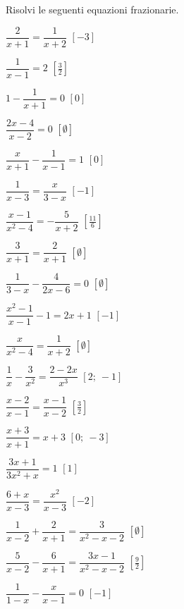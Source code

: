\begin{esercizio}[\Ast]
\label{ese:20.15}
Risolvi le seguenti equazioni frazionarie.
\begin{multicols}{2}
\begin{enumeratea}
 \item $\dfrac{2}{x+1}=\dfrac{1}{x+2}$ \hfill $\left[-3\right]$
 \item $\dfrac{1}{x-1}=2$ \hfill $\left[\frac{3}{2}\right]$
 \item $1-\dfrac{1}{x+1}=0$ \hfill $\left[0\right]$
 \item $\dfrac{2x-4}{x-2}=0$ \hfill $\left[\emptyset\right]$
 \item $\dfrac{x}{x+1}-\dfrac{1}{x-1}=1$ \hfill $\left[0\right]$
 \item $\dfrac{1}{x-3}=\dfrac{x}{3-x}$ \hfill $\left[-1\right]$
 \item $\dfrac{x-1}{x^{2}-4}=-{\dfrac{5}{x+2}}$ 
  \hfill $\left[\frac{11}{6}\right]$
 \item $\dfrac{3}{x+1}=\dfrac{2}{x+1}$ \hfill $\left[\emptyset\right]$
 \item $\dfrac{1}{3-x}-\dfrac{4}{2x-6}=0$ \hfill $\left[\emptyset\right]$
 \item $\dfrac{x^{2}-1}{x-1}-1=2x+1$ \hfill $\left[-1\right]$
 \item $\dfrac{x}{x^{2}-4}=\dfrac{1}{x+2}$ \hfill $\left[\emptyset\right]$
 \item $\dfrac{1}{x}-\dfrac{3}{x^{2}}=\dfrac{2-2x}{x^{3}}$ 
  \hfill $\left[2;~-1\right]$
 \item $\dfrac{x-2}{x-1}=\dfrac{x-1}{x-2}$ \hfill $\left[\frac{3}{2}\right]$
 \item $\dfrac{x+3}{x+1}=x+3$ \hfill $\left[0;~-3\right]$
 \item $\dfrac{3x+1}{3x^{2}+x}=1$ \hfill $\left[1\right]$
 \item $\dfrac{6+x}{x-3}=\dfrac{x^{2}}{x-3}$ \hfill $\left[-2\right]$
 \item $\dfrac{1}{x-2}+\dfrac{2}{x+1}=\dfrac{3}{x^{2}-x-2}$ 
  \hfill $\left[\emptyset\right]$
 \item $\dfrac{5}{x-2}-\dfrac{6}{x+1}=\dfrac{3x-1}{x^{2}-x-2}$
  \hfill $\left[\frac{9}{2}\right]$
 \item $\dfrac{1}{1-x}-\dfrac{x}{x-1}=0$
  \hfill $\left[-1\right]$
\end{enumeratea}
\end{multicols}
\end{esercizio}

